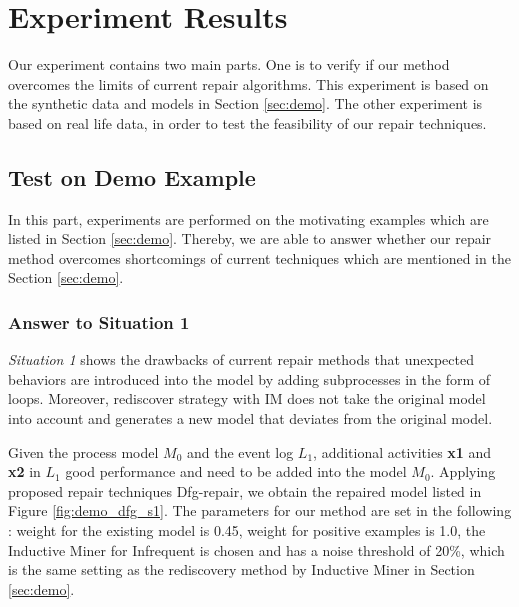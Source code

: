 \section{Experiment Results}
Our experiment contains two main parts. One is to verify if our method overcomes the limits of current repair algorithms. This experiment is based on the synthetic data and models in Section \ref{sec:demo}. The other experiment is based on real life data, in order to test the feasibility of our repair techniques.
 
\subsection{Test on Demo Example}
In this part, experiments are performed on the motivating examples which are listed in Section \ref{sec:demo}. Thereby, we are able to answer whether our repair method overcomes shortcomings of current techniques which are mentioned in the Section \ref{sec:demo}. 
\subsubsection{Answer to Situation 1}
\emph{Situation 1} shows the drawbacks of current repair methods \cite{fahland2015model} that unexpected behaviors are introduced into the model by adding subprocesses in the form of loops. Moreover, rediscover strategy with IM does not take the original model into account and generates a new model that deviates from the original model. 


Given the process model $M_0$ and the event log $L_1$, additional activities \textbf{x1} and \textbf{x2} in $L_1$ 
good performance and need to be added into the model $M_0$. Applying proposed repair techniques Dfg-repair, we obtain the  repaired model listed in Figure \ref{fig:demo_dfg_s1}. The parameters for our method are set in the following : weight for the existing model is 0.45, weight for positive examples is 1.0, the Inductive Miner for Infrequent is chosen and has a noise threshold of 20\%, which is the same setting as the rediscovery method by Inductive Miner in Section \ref{sec:demo}. 


